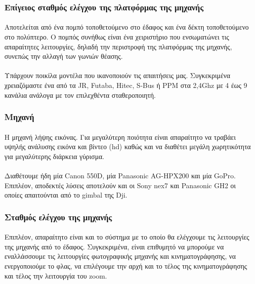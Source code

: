 \documentclass[a4paper, 12pt, twoside]{report}
\begin{document}
{{{{{{			
		\subsubsection{Επίγειος σταθμός ελέγχου της πλατφόρμας της μηχανής}
			\paragraph{}{Αποτελείται από ένα πομπό τοποθετούμενο στο έδαφος και ένα δέκτη τοποθετούμενο στο πολύπτερο. Ο πομπός συνήθως είναι ένα χειριστήριο που ενσωματώνει τις απαραίτητες λειτουργίες, δηλαδή την περιστροφή της πλατφόρμας της μηχανής, συνεπώς την αλλαγή των γωνιών θέασης.
			}
			\paragraph{}{Υπάρχουν ποικίλα μοντέλα που ικανοποιούν τις απαιτήσεις μας. Συγκεκριμένα χρειαζόμαστε ένα από τα JR, Futaba, Hitec, S-Bus ή PPM στα 2,4Ghz με 4 έως 9 κανάλια ανάλογα με τον επιλεχθέντα σταθεροποιητή.
			}
		
		\subsubsection{Μηχανή}
			\paragraph{}{Η μηχανή λήψης εικόνας. Για μεγαλύτερη ποιότητα είναι απαραίτητο να τραβάει υψηλής ανάλυσης εικόνα και βίντεο (hd) καθώς και να διαθέτει μεγάλη χωρητικότητα για μεγαλύτερης διάρκεια γύρισμα.
			}
			\paragraph{}{Διαθέτουμε ήδη μία Canon 550D, μία Panasonic AG-HPX200 και μία GoPro. Επιπλέον, αποδεκτές λύσεις αποτελούν και οι Sony nex7 και Panasonic GH2 οι οποίες απαιτούνται από το gimbal της Dji.
			}
		
		\subsubsection{Σταθμός ελέγχου της μηχανής}	
			\paragraph{}{Επιπλέον, απαραίτητο είναι και το σύστημα με το οποίο θα ελέγχουμε τις λειτουργίες της μηχανής από το έδαφος. Συγκεκριμένα, είναι επιθυμητό να μπορούμε να εναλλάσσουμε τις λειτουργίες φωτογραφικής μηχανής και κινηματογράφησης, να ενεργοποιούμε το φλας, να επιλέγουμε την αρχή και το τέλος της κινηματογράφησης και τέλος την λειτουργία του zoom.
			}
}}}}}}
\end{document}
